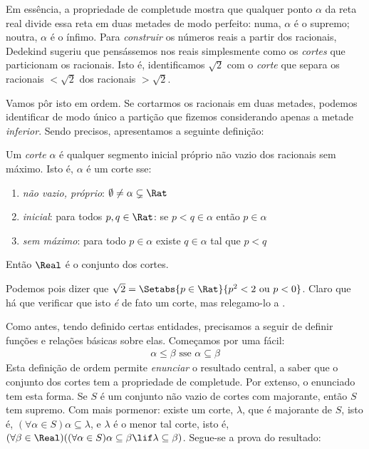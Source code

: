 \documentclass[../../../include/open-logic-section]{subfiles}
\begin{document}

Em essência, a propriedade de completude mostra que qualquer ponto $\alpha$ da
reta real divide essa reta em duas metades de modo perfeito: numa, $\alpha$ é o
supremo; noutra, $\alpha$ é o ínfimo. Para \emph{construir} os números reais a
partir dos racionais, Dedekind sugeriu que pensássemos nos reais simplesmente
como os \emph{cortes} que particionam os racionais. Isto é, identificamos
$\sqrt{2}$ com o \emph{corte} que separa os racionais $< \sqrt{2}$ dos racionais
$> \sqrt{2}$.

Vamos pôr isto em ordem. Se cortarmos os racionais em duas metades, podemos
identificar de modo único a partição que fizemos considerando apenas a metade
\emph{inferior}. Sendo precisos, apresentamos a seguinte definição:

\begin{defn}[Corte] 
Um \emph{corte} $\alpha$ é qualquer segmento inicial próprio não vazio dos
racionais sem máximo. Isto é, $\alpha$ é um corte sse:
\begin{enumerate}
	\item \emph{não vazio, próprio}: $\emptyset \neq \alpha \subsetneq \Rat$
	\item \emph{inicial}: para todos $p,q \in \Rat$: se $p < q \in \alpha$ então $p \in \alpha$
	\item \emph{sem máximo}: para todo $p \in \alpha$ existe $q \in \alpha$ tal que $p < q$ 
\end{enumerate} 
Então $\Real$ é o conjunto dos cortes. 
\end{defn}

Podemos pois dizer que $\sqrt{2} = \Setabs{p \in \Rat}{p^2 < 2\text{
ou }p < 0}$. Claro que há que verificar que isto \emph{é} de fato um corte,
mas relegamo-lo a .

Como antes, tendo definido certas entidades, precisamos a seguir de definir
funções e relações básicas sobre elas. Começamos por uma fácil:
\begin{align*}
	\alpha \leq \beta \text{ sse }\alpha \subseteq \beta
\end{align*}
Esta definição de ordem permite \emph{enunciar} o resultado central, a saber que
o conjunto dos cortes tem a propriedade de completude. Por extenso, o enunciado
tem esta forma. Se $S$ é um conjunto não vazio de cortes com majorante, então
$S$ tem supremo. Com mais pormenor: existe um corte, $\lambda$, que é majorante
de $S$, isto é, $(\forall \alpha \in S)\alpha \subseteq
\lambda$, e $\lambda$ é o menor tal corte, isto é, $(\forall \beta \in \Real)((\forall \alpha \in S)\alpha \subseteq \beta \lif \lambda \subseteq \beta)$. Segue-se a prova do resultado:
\end{document}
